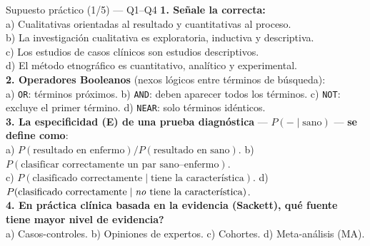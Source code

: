 \documentclass[aspectratio=169,8pt]{beamer}
\begin{document}
\begin{frame}{Supuesto pr\'actico (1/5) --- Q1--Q4}
  \scriptsize
  \textbf{1. Se\~nale la correcta:}\\
  a) Cualitativas orientadas al resultado y cuantitativas al proceso.\\
  b) La investigaci\'on cualitativa es exploratoria, inductiva y descriptiva.\\
  c) Los estudios de casos cl\'inicos son estudios descriptivos.\\
  d) El m\'etodo etnogr\'afico es cuantitativo, anal\'itico y experimental.\\[4pt]
  \textbf{2. Operadores Booleanos} (nexos l\'ogicos entre t\'erminos de b\'usqueda):\\
  a) \texttt{OR}: t\'erminos pr\'oximos.\;
  b) \texttt{AND}: deben aparecer todos los t\'erminos.\;
  c) \texttt{NOT}: excluye el primer t\'ermino.\;
  d) \texttt{NEAR}: solo t\'erminos id\'enticos.\\[4pt]
  \textbf{3. La especificidad (E) de una prueba diagn\'ostica} --- $P(-\mid\text{sano})$ --- \textbf{se define como}:\\
  a) $P(\text{resultado en enfermo})/P(\text{resultado en sano})$. \;
  b) $P(\text{clasificar correctamente un par sano--enfermo})$.\\
  c) $P(\text{clasificado correctamente}\mid\text{tiene la caracter\'istica})$. \;
  d) $P(\text{clasificado correctamente}\mid\text{\emph{no} tiene la caracter\'istica})$.\\[4pt]
  \textbf{4. En pr\'actica cl\'inica basada en la evidencia (Sackett), \textquestiondown{}qu\'e fuente tiene mayor nivel de evidencia?}\\
  a) Casos-controles. \; b) Opiniones de expertos. \; c) Cohortes. \; d) Meta-an\'alisis (MA).
\end{frame}
\end{document}
